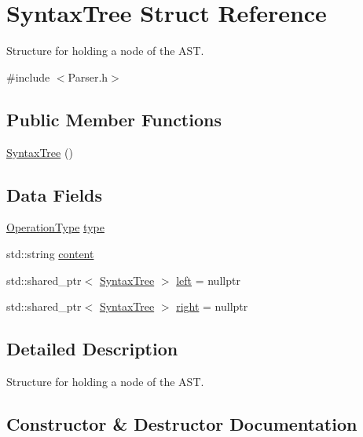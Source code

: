 \hypertarget{structSyntaxTree}{}\section{Syntax\+Tree Struct Reference}
\label{structSyntaxTree}


Structure for holding a node of the A\+ST.  




{\ttfamily \#include $<$Parser.\+h$>$}

\subsection*{Public Member Functions}
\begin{DoxyCompactItemize}
\item 
\hyperlink{structSyntaxTree_a5b2819578422b1c3568006abb2cfdcba}{Syntax\+Tree} ()
\end{DoxyCompactItemize}
\subsection*{Data Fields}
\begin{DoxyCompactItemize}
\item 
\hyperlink{Parser_8h_a9a2c9c31d675b34f6ec35cc1ca89e047}{Operation\+Type} \hyperlink{structSyntaxTree_a5efd39b3313598e59a977007f8873cf2}{type}
\item 
std\+::string \hyperlink{structSyntaxTree_af0881fd58616a52a55e2f5ce1ac5b590}{content}
\item 
std\+::shared\+\_\+ptr$<$ \hyperlink{structSyntaxTree}{Syntax\+Tree} $>$ \hyperlink{structSyntaxTree_a669a75fc1bfa74d6941a233d577e679e}{left} = nullptr
\item 
std\+::shared\+\_\+ptr$<$ \hyperlink{structSyntaxTree}{Syntax\+Tree} $>$ \hyperlink{structSyntaxTree_a72ed97cc91ff5e21575ddb73f4dc1255}{right} = nullptr
\end{DoxyCompactItemize}


\subsection{Detailed Description}
Structure for holding a node of the A\+ST. 

\subsection{Constructor \& Destructor Documentation}
